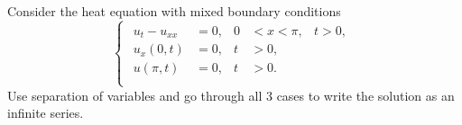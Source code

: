 \documentclass[plain]{pset}
\begin{document}
\pagebreak

\begin{problem}
Consider the heat equation with mixed boundary conditions
\[
    \begin{cases}
        \begin{aligned}
            u_t - u_{xx} & = 0, & 0 & < x < \pi, & t > 0, \\
            u_x(0, t)    & = 0, & t & > 0,                \\
            u(\pi, t)    & = 0, & t & > 0.                \\
        \end{aligned}
    \end{cases}
\]
Use separation of variables and go through all 3 cases to write the solution as an infinite series.
\end{problem}
\end{document}
